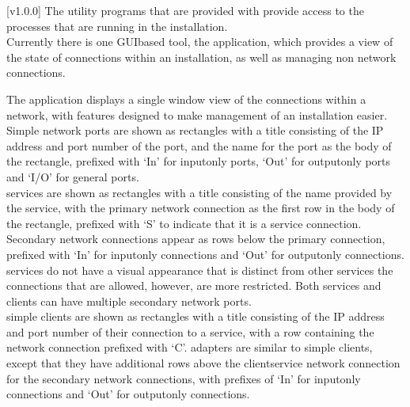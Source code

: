 [v1.0.0]
The utility programs that are provided with \mplusm{} provide access to the processes that
are running in the \mplusm{} installation.\\

Currently there is one GUI\longDash{}based tool, the \emph{\MMMU} application, which
provides a view of the state of connections within an \mplusm{} installation, as well as
managing non\longDash\mplusm{} \yarp{} network connections.

The \emph{\MMMU} application displays a single window view of the connections within a
\yarp{} network, with features designed to make management of an \mplusm{} installation
easier.
Simple \yarp{} network ports are shown as rectangles with a title consisting of the IP
address and port number of the port, and the \yarp{} name for the port as the body of the
rectangle, prefixed with `In' for input\longDash{}only ports, `Out' for
output\longDash{}only ports and `I/O' for general ports.\\

\mplusm{} services are shown as rectangles with a title consisting of the name provided by
the service, with the primary \yarp{} network connection as the first row in the body of
the rectangle, prefixed with `S' to indicate that it is a service connection.
Secondary \yarp{} network connections appear as rows below the primary connection,
prefixed with `In' for input\longDash{}only connections and `Out' for
output\longDash{}only connections.
\mplusm{}  services do not have a visual appearance that is distinct from
other \mplusm{} services \longDash{} the connections that are allowed, however, are more
restricted.
Both \mplusm{} services and clients can have multiple secondary \yarp{} network ports.\\

\mplusm{} simple clients are shown as rectangles with a title consisting of the IP address
and port number of their connection to a service, with a row containing the \yarp{}
network connection prefixed with `C'.
\mplusm{} adapters are similar to \mplusm{} simple clients, except that they have
additional rows above the client\longDash{}service \yarp{} network connection for the
secondary \yarp{} network connections, with prefixes of `In' for input\longDash{}only
connections and `Out' for output\longDash{}only connections.\\

